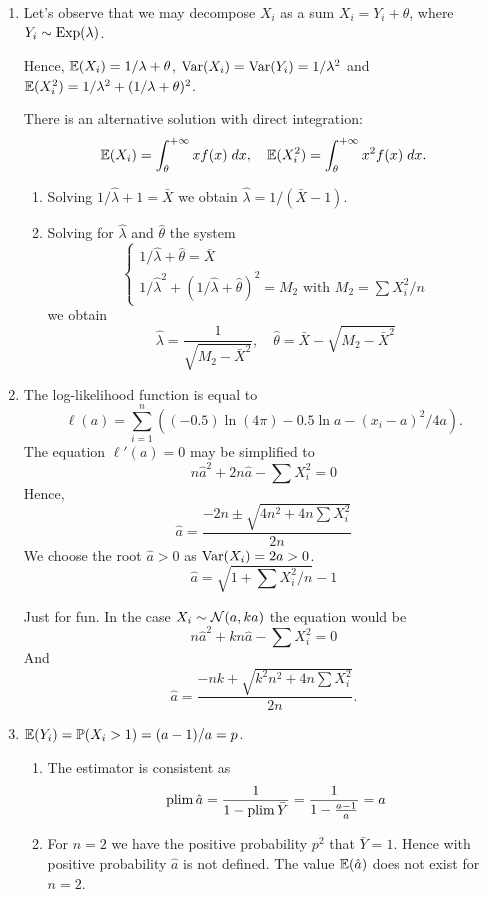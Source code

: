 \begin{enumerate}

\item Let's observe that we may decompose $X_i$ as a sum $X_i = Y_i + \theta$,
where $Y_i \sim \mathrm{Exp}(\lambda)$. 

Hence, $\operatorname{\mathbb{E}}(X_i) = 1/\lambda + \theta$, $\operatorname{Var}(X_i) = \operatorname{Var}(Y_i) = 1/\lambda^2$
and $\operatorname{\mathbb{E}}(X_i^2) = 1/\lambda^2 + (1/\lambda + \theta)^2$.

There is an alternative solution with direct integration:
\[
\operatorname{\mathbb{E}}(X_i) = \int_{\theta}^{+\infty} x f(x) \; dx, \quad \operatorname{\mathbb{E}}(X_i^2) = \int_{\theta}^{+\infty} x^2 f(x) \; dx.
\]

\begin{enumerate}
    \item Solving $1/\hat\lambda + 1 = \bar X$ we obtain $\hat\lambda = 1/ (\bar X - 1)$.
    \item Solving for $\hat\lambda$ and $\hat\theta$ the system
\[
\begin{cases}
    1/\hat\lambda + \hat \theta = \bar X \\
    1/\hat\lambda^2 + (1/\hat\lambda + \hat\theta)^2 = M_2 \text{ with } M_2 = \sum X_i^2/n
\end{cases}    
\]
we obtain 
\[
\hat \lambda = \frac{1}{\sqrt{M_2 - \bar X^2}} , \quad \hat \theta =  \bar X - \sqrt{M_2 - \bar X^2}   
\]
\end{enumerate}

\item The log-likelihood function is equal to
\[
\ell(a) = \sum_{i=1}^n \left( (-0.5)\ln(4\pi) - 0.5 \ln a - (x_i - a)^2 / 4a \right).
\]
The equation $\ell'(a) = 0$ may be simplified to
\[
    n\hat a^2 + 2n\hat a - \sum X_i^2  = 0    
\]
Hence, 
\[
\hat a = \frac{-2n \pm \sqrt{4 n^2 + 4n \sum X_i^2}}{2n}
\]
We choose the root $\hat a > 0$ as $\operatorname{Var}(X_i) = 2a > 0$.
\[
\hat a = \sqrt{ 1  + \sum X_i^2/n} - 1
\]

Just for fun. 
In the case $X_i \sim \mathcal{N}(a, ka)$ the equation would be
\[
    n\hat a^2 + k n\hat a - \sum X_i^2  = 0    
\]
And 
\[
\hat a = \frac{-nk + \sqrt{k^2 n^2  + 4n \sum X_i^2}}{2n}.    
\]



\item $\operatorname{\mathbb{E}}(Y_i) = \operatorname{\mathbb{P}}(X_i > 1) = (a-1) / a = p$.
\begin{enumerate}
    \item The estimator is consistent as
\[
\operatorname*{plim} \hat a = \frac {1}{1- \operatorname*{plim} \bar Y } = \frac{1}{1 - \frac{a-1}{a}} = a
\]
\item 
For $n=2$ we have the positive probability $p^2$ that $\bar Y = 1$.
Hence with positive probability $\hat a$ is not defined.
The value $\operatorname{\mathbb{E}}(\hat a)$ does not exist for $n=2$.
\end{enumerate}


\end{enumerate}
